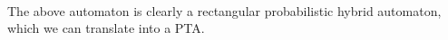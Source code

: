 \begin{ex}
\begin{itemize}
\begin{align*}
        \end{align*}
\end{itemize}
The above automaton is clearly a rectangular probabilistic hybrid automaton, which we can translate into a PTA.
%
\end{ex}
